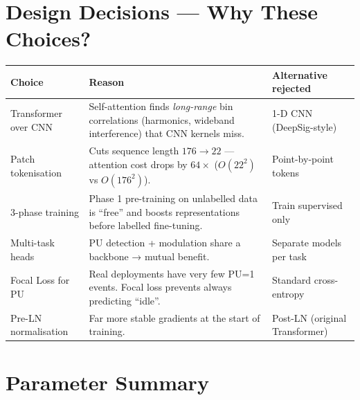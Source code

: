 \documentclass[11pt,a4paper]{article}
\begin{document}
\section{Design Decisions — Why These Choices?}

\begin{center}
\renewcommand{\arraystretch}{1.3}
\begin{tabularx}{\textwidth}{l X X}
\toprule
\textbf{Choice} & \textbf{Reason} & \textbf{Alternative rejected} \\
\midrule
Transformer over CNN
  & Self-attention finds \emph{long-range} bin correlations (harmonics,
    wideband interference) that CNN kernels miss.
  & 1-D CNN (DeepSig-style) \\
Patch tokenisation
  & Cuts sequence length $176\to22$ — attention cost drops
    by $64\times$ ($O(22^2)$ vs $O(176^2)$).
  & Point-by-point tokens \\
3-phase training
  & Phase 1 pre-training on unlabelled data is ``free'' and
    boosts representations before labelled fine-tuning.
  & Train supervised only \\
Multi-task heads
  & PU detection + modulation share a backbone → mutual benefit.
  & Separate models per task \\
Focal Loss for PU
  & Real deployments have very few PU=1 events.
    Focal loss prevents always predicting ``idle''.
  & Standard cross-entropy \\
Pre-LN normalisation
  & Far more stable gradients at the start of training.
  & Post-LN (original Transformer) \\
\bottomrule
\end{tabularx}
\end{center}

\section{Parameter Summary}
\end{document}
